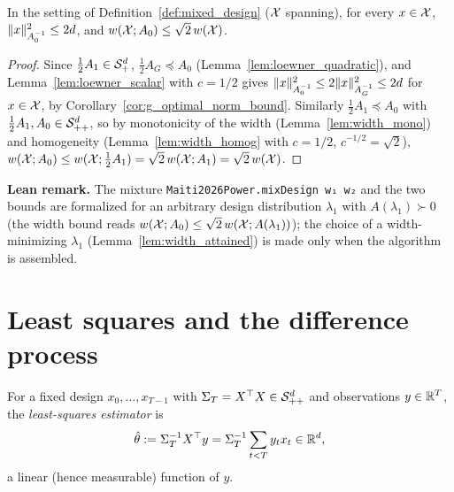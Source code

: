 \begin{lemma}\label{lem:mixed_design_bounds}
\leanok
{}
In the setting of Definition~\ref{def:mixed_design} ($\mathcal{X}$ spanning), for every $x \in \mathcal{X}$,
$\lVert x \rVert_{A_0^{-1}}^2 \le 2d$, and $w(\mathcal{X};A_0) \le \sqrt2\,w(\mathcal{X})$.
\end{lemma}

\begin{proof}
\leanok
{}
Since $\frac12A_1 \in \mathcal{S}_{+}^{d}$, $\frac12A_G \preceq A_0$ (Lemma~\ref{lem:loewner_quadratic}), and
Lemma~\ref{lem:loewner_scalar} with $c = 1/2$ gives $\lVert x \rVert_{A_0^{-1}}^2 \le 2\lVert x \rVert_{A_G^{-1}}^2
\le 2d$ for $x \in \mathcal{X}$, by Corollary~\ref{cor:g_optimal_norm_bound}. Similarly
$\frac12A_1 \preceq A_0$ with $\frac12A_1, A_0 \in \mathcal{S}_{++}^{d}$, so by monotonicity of the width
(Lemma~\ref{lem:width_mono}) and homogeneity (Lemma~\ref{lem:width_homog} with $c = 1/2$,
$c^{-1/2} = \sqrt2$),
$w(\mathcal{X};A_0) \le w(\mathcal{X};\tfrac12A_1) = \sqrt2\,w(\mathcal{X};A_1) = \sqrt2\,w(\mathcal{X})$.
\end{proof}

\textbf{Lean remark.} The mixture \texttt{Maiti2026Power.mixDesign w₁ w₂} and the two bounds are
formalized for an arbitrary design distribution $\lambda_1$ with $A(\lambda_1) \succ 0$ (the
width bound reads $w(\mathcal{X};A_0) \le \sqrt2\,w(\mathcal{X};A(\lambda_1))$); the choice of a
width-minimizing $\lambda_1$ (Lemma~\ref{lem:width_attained}) is made only when the algorithm
is assembled.

\section{Least squares and the difference process}
\label{sec:upper_ls}

\begin{definition}\label{def:least_squares}
\leanok
{}
For a fixed design $x_0,\dots,x_{T-1}$ with $\Sigma_T = X^\top X \in \mathcal{S}_{++}^{d}$ and observations
$y \in \mathbb{R}^T$, the \emph{least-squares estimator} is
\[
  \hat\theta := \Sigma_T^{-1}X^\top y = \Sigma_T^{-1}\sum_{t<T}y_tx_t \in \mathbb{R}^d ,
\]
a linear (hence measurable) function of $y$.
\end{definition}

